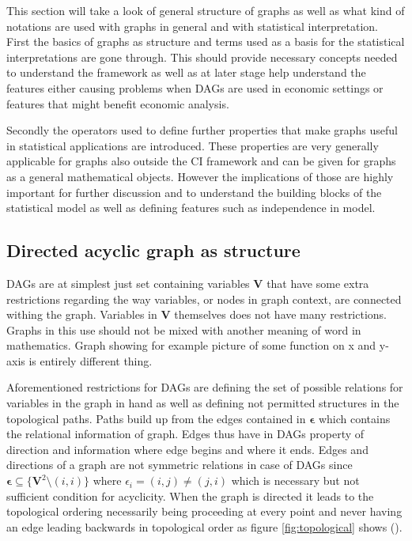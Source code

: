\documentclass[main=english,12pt,a4paper,pdftex,econ,utf8]{aaltothesis}
\newcommand{\e}{\bm{\epsilon}}
\newcommand{\vars}{\bm{V}}
\begin{document}
This section will take a look of general structure of graphs as well as what kind of notations are used with graphs in general and with statistical interpretation. First the basics of graphs as structure and terms used as a basis for the statistical interpretations are gone through. This should provide necessary concepts needed to understand the framework as well as at later stage help understand the features either causing problems when DAGs are used in economic settings or features that might benefit economic analysis.

Secondly the operators used to define further properties that make graphs useful in statistical applications are introduced. These properties are very generally applicable for graphs also outside the CI framework and can be given for graphs as a general mathematical objects. However the implications of those are highly important for further discussion and to understand the building blocks of the statistical model as well as defining features such as independence in model.

\subsection{Directed acyclic graph as structure}

DAGs are at simplest just set containing variables $\vars$ that have some extra restrictions regarding the way variables, or nodes in graph context, are connected withing the graph. Variables in $\vars$ themselves does not have many restrictions. Graphs in this use should not be mixed with another meaning of word in mathematics. Graph showing for example picture of some function on x and y-axis is entirely different thing.

Aforementioned restrictions for DAGs are defining the set of possible relations for variables in the graph in hand as well as defining not permitted structures in the topological paths. Paths build up from the edges contained in $\e$ which contains the relational information of graph. Edges thus have in DAGs property of direction and information where edge begins and where it ends. Edges and directions of a graph are not symmetric relations in case of DAGs since $\e\subseteq \{\vars^2\setminus(i,i)\}$ where $\epsilon_i=(i,j)\neq(j,i)$ which is necessary but not sufficient condition for acyclicity. When the graph is directed it leads to the topological ordering necessarily being proceeding at every point and never having an edge leading backwards in topological order as figure \ref{fig:topological} shows (\cite{Peters2017}).
\end{document}
